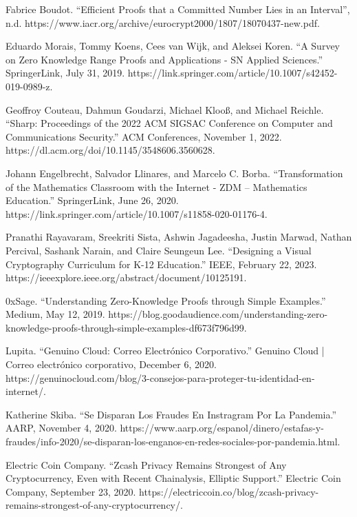 \begin{thebibliography}{9}
Fabrice Boudot. “Efficient Proofs that a Committed Number Lies in an Interval”, n.d. https://www.iacr.org/archive/eurocrypt2000/1807/18070437-new.pdf. 

Eduardo Morais, Tommy Koens, Cees van Wijk, and Aleksei Koren. “A Survey on Zero Knowledge Range Proofs and Applications - SN Applied Sciences.” SpringerLink, July 31, 2019. https://link.springer.com/article/10.1007/s42452-019-0989-z. 

Geoffroy Couteau, Dahmun Goudarzi, Michael Klooß, and Michael Reichle. “Sharp: Proceedings of the 2022 ACM SIGSAC Conference on Computer and Communications Security.” ACM Conferences, November 1, 2022. https://dl.acm.org/doi/10.1145/3548606.3560628. 

Johann Engelbrecht, Salvador Llinares, and Marcelo C. Borba. “Transformation of the Mathematics Classroom with the Internet - ZDM – Mathematics Education.” SpringerLink, June 26, 2020. https://link.springer.com/article/10.1007/s11858-020-01176-4. 

Pranathi Rayavaram, Sreekriti Sista, Ashwin Jagadeesha, Justin Marwad, Nathan Percival, Sashank Narain, and Claire Seungeun Lee. “Designing a Visual Cryptography Curriculum for K-12 Education.” IEEE, February 22, 2023. https://ieeexplore.ieee.org/abstract/document/10125191. 

0xSage. “Understanding Zero-Knowledge Proofs through Simple Examples.” Medium, May 12, 2019. https://blog.goodaudience.com/understanding-zero-knowledge-proofs-through-simple-examples-df673f796d99.  

Lupita. “Genuino Cloud: Correo Electrónico Corporativo.” Genuino Cloud | Correo electrónico corporativo, December 6, 2020. https://genuinocloud.com/blog/3-consejos-para-proteger-tu-identidad-en-internet/. 

Katherine Skiba. “Se Disparan Los Fraudes En Instragram Por La Pandemia.” AARP, November 4, 2020. https://www.aarp.org/espanol/dinero/estafas-y-fraudes/info-2020/se-disparan-los-enganos-en-redes-sociales-por-pandemia.html. 

Electric Coin Company. “Zcash Privacy Remains Strongest of Any Cryptocurrency, Even with Recent Chainalysis, Elliptic Support.” Electric Coin Company, September 23, 2020. https://electriccoin.co/blog/zcash-privacy-remains-strongest-of-any-cryptocurrency/. 


\end{thebibliography}
